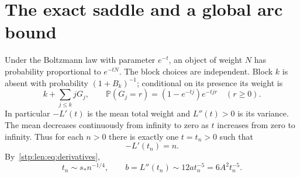\documentclass[11pt]{article}
\theoremstyle{remark}\newtheorem{remark}[theorem]{Remark}
\newcommand{\PP}{\mathbb P}
\newcommand{\as}{s_*}\newcommand{\eps}{\varepsilon}\newcommand{\poc}[2]{(#1;#2)_\infty}
\begin{document}
\section{The exact saddle and a global arc bound}\label{stp:len:sec:arcs}
Under the Boltzmann law with parameter $e^{-t}$, an object of weight $N$ has probability proportional to $e^{-tN}$. The block choices are independent. Block $k$ is absent with probability $(1+B_k)^{-1}$; conditional on its presence its weight is
\begin{equation}\label{stp:len:eq:blocklaw}
 k+\sum_{j\le k}jG_j,\qquad
 \PP(G_j=r)=(1-e^{-tj})e^{-tjr}\quad(r\ge0).
\end{equation}
In particular $-L'(t)$ is the mean total weight and $L''(t)>0$ is its variance. The mean decreases continuously from infinity to zero as $t$ increases from zero to infinity. Thus for each $n>0$ there is exactly one $t=t_n>0$ such that
\begin{equation}\label{stp:len:eq:saddle}
 -L'(t_n)=n.
\end{equation}
By~\eqref{stp:len:eq:derivatives},
\begin{equation}\label{stp:len:eq:scale}
 t_n\sim\as n^{-1/4},\qquad
 b=L''(t_n)\sim12at_n^{-5}=6A^2t_n^{-5}.
\end{equation}
\end{document}
